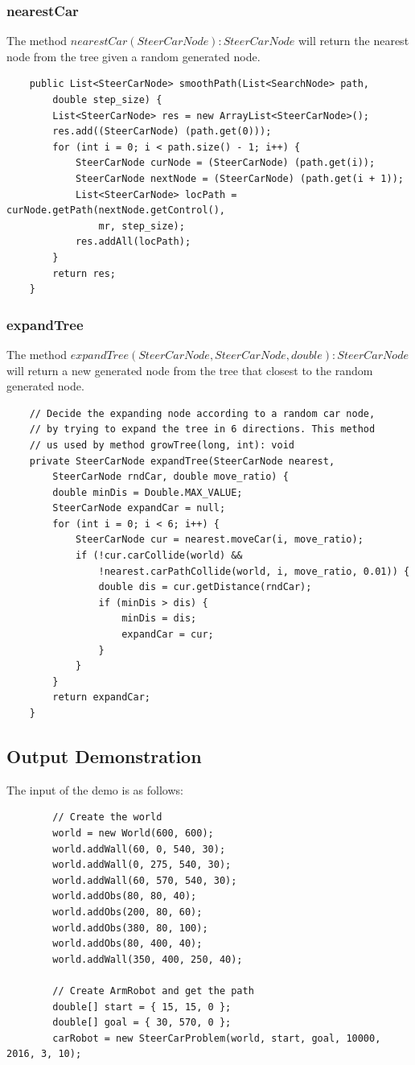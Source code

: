 \documentclass{article}
\begin{document}
\subsubsection{nearestCar}
The method $nearestCar(SteerCarNode):SteerCarNode$ will return the nearest node from the tree given a random generated node. 
\begin{lstlisting}
	public List<SteerCarNode> smoothPath(List<SearchNode> path, 
		double step_size) {
		List<SteerCarNode> res = new ArrayList<SteerCarNode>();
		res.add((SteerCarNode) (path.get(0)));
		for (int i = 0; i < path.size() - 1; i++) {
			SteerCarNode curNode = (SteerCarNode) (path.get(i));
			SteerCarNode nextNode = (SteerCarNode) (path.get(i + 1));
			List<SteerCarNode> locPath = curNode.getPath(nextNode.getControl(), 
				mr, step_size);
			res.addAll(locPath);
		}
		return res;
	}
\end{lstlisting}

\subsubsection{expandTree}
The method $expandTree(SteerCarNode, SteerCarNode, double):SteerCarNode$ will return a new generated node from the tree that closest to the random generated node.
\begin{lstlisting}
	// Decide the expanding node according to a random car node,
	// by trying to expand the tree in 6 directions. This method
	// us used by method growTree(long, int): void
	private SteerCarNode expandTree(SteerCarNode nearest, 
		SteerCarNode rndCar, double move_ratio) {
		double minDis = Double.MAX_VALUE;
		SteerCarNode expandCar = null;
		for (int i = 0; i < 6; i++) {
			SteerCarNode cur = nearest.moveCar(i, move_ratio);
			if (!cur.carCollide(world) && 
				!nearest.carPathCollide(world, i, move_ratio, 0.01)) {
				double dis = cur.getDistance(rndCar);
				if (minDis > dis) {
					minDis = dis;
					expandCar = cur;
				}
			}
		}
		return expandCar;
	}
\end{lstlisting}

\subsection{Output Demonstration}
The input of the demo is as follows:
\begin{lstlisting}
		// Create the world
		world = new World(600, 600);
		world.addWall(60, 0, 540, 30);
		world.addWall(0, 275, 540, 30);
		world.addWall(60, 570, 540, 30);
		world.addObs(80, 80, 40);
		world.addObs(200, 80, 60);
		world.addObs(380, 80, 100);
		world.addObs(80, 400, 40);
		world.addWall(350, 400, 250, 40);

		// Create ArmRobot and get the path
		double[] start = { 15, 15, 0 };
		double[] goal = { 30, 570, 0 };
		carRobot = new SteerCarProblem(world, start, goal, 10000, 2016, 3, 10);
\end{lstlisting}
\end{document}
